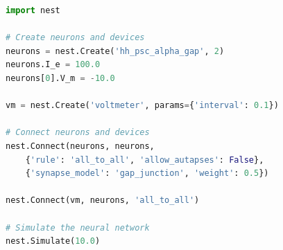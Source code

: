 \begin{figure}[ht!]
  \centering
\begin{lstlisting}[language=Python, label=lst:simple_simulation, caption={Every simulation script using PyNEST starts with importing the \texttt{nest} module in Python. In line 4, we create two Hodgkin-Huxley neurons as instances of the \emph{hh\_psc\_alpha\_gap} model. In line 5, we set a background current of 100.0 pA for both neurons. Line 6 modifies the initial membrane potentials of the first neuron instance to be at -10.0 mV. In line 8, we create a \texttt{voltmeter} to record the membrane potential of both neurons. In line 11, we connect the first neuron with the second neuron, and vice-versa using the \emph{gap\_junction} synapse model. Finally, we connect the voltmeter to the neurons to record their membrane potential over the course of the simulation in line 15 and run the simulation for 10.0 milliseconds in the last line by calling the \texttt{Simulate()} function.}, captionpos=b]
import nest

# Create neurons and devices
neurons = nest.Create('hh_psc_alpha_gap', 2)
neurons.I_e = 100.0
neurons[0].V_m = -10.0

vm = nest.Create('voltmeter', params={'interval': 0.1})

# Connect neurons and devices
nest.Connect(neurons, neurons,
    {'rule': 'all_to_all', 'allow_autapses': False},
    {'synapse_model': 'gap_junction', 'weight': 0.5})

nest.Connect(vm, neurons, 'all_to_all')

# Simulate the neural network
nest.Simulate(10.0)
\end{lstlisting}
\end{figure}

